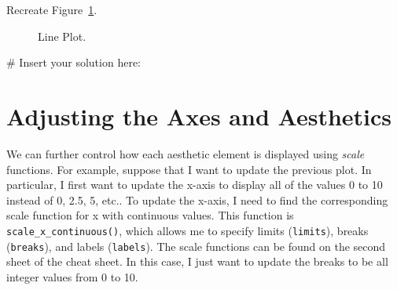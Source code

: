 \documentclass[
  letterpaper,
]{latex/krantz}
\makeatletter
\newenvironment{Shaded}{\begin{snugshade}}{\end{snugshade}}
\newcommand{\CommentTok}[1]{\textcolor[rgb]{0.37,0.37,0.37}{#1}}
\newenvironment{kframe}{%
\medskip{}
\setlength{\fboxsep}{.8em}
 \def\at@end@of@kframe{}%
 \ifinner\ifhmode%
  \def\at@end@of@kframe{\end{minipage}}%
  \begin{minipage}{\columnwidth}%
 \fi\fi%
 \def\FrameCommand##1{\hskip\@totalleftmargin \hskip-\fboxsep
 \colorbox{shadecolor}{##1}\hskip-\fboxsep
     \hskip-\linewidth \hskip-\@totalleftmargin \hskip\columnwidth}%
 \MakeFramed {\advance\hsize-\width
   \@totalleftmargin\z@ \linewidth\hsize
   \@setminipage}}%
 {\par\unskip\endMakeFramed%
 \at@end@of@kframe}
\renewenvironment{Shaded}{\begin{kframe}}{\end{kframe}}
\makeatother
\begin{document}
Recreate Figure~\ref{fig-line-plot}.

\begin{figure}


\caption{\label{fig-line-plot}Line Plot.}

\end{figure}%

\begin{Shaded}
\begin{Highlighting}[]
\CommentTok{\# Insert your solution here: }
\end{Highlighting}
\end{Shaded}

\section{Adjusting the Axes and
Aesthetics}\label{adjusting-the-axes-and-aesthetics}

We can further control how each aesthetic element is displayed using
\emph{scale}
functions. For
example, suppose that I want to update the previous plot. In particular,
I first want to update the x-axis to display all of the values 0 to 10
instead of 0, 2.5, 5, etc.. To update the x-axis, I need to find the
corresponding scale function for x with continuous values. This function
is
\texttt{scale\_x\_continuous()},
which allows me to specify limits (\texttt{limits}), breaks
(\texttt{breaks}), and labels (\texttt{labels}). The scale functions can
be found on the second sheet of the cheat sheet. In this case, I just
want to update the breaks to be all integer values from 0 to 10.
\end{document}
